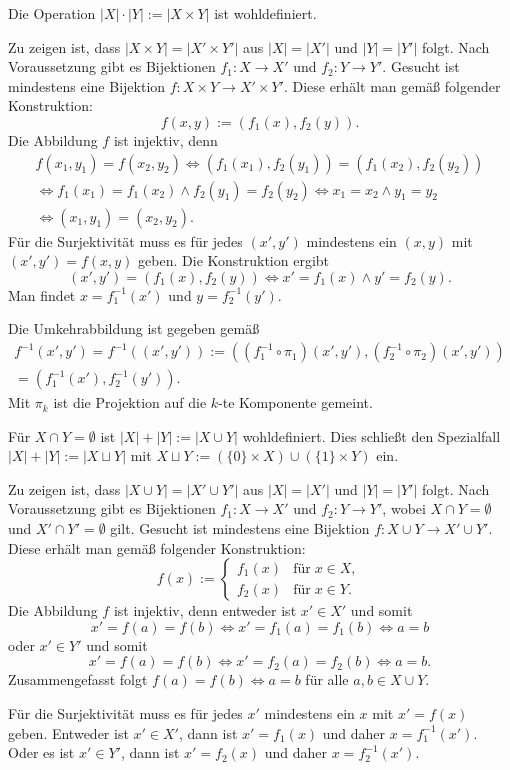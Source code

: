 \begin{Satz}\newlinefirst
Die Operation $|X|\cdot |Y|:=|X\times Y|$ ist wohldefiniert.
\end{Satz}
\begin{Beweis}
Zu zeigen ist, dass $|X\times Y|=|X'\times Y'|$
aus $|X|=|X'|$ und $|Y|=|Y'|$ folgt. Nach Voraussetzung gibt
es Bijektionen $f_1\colon X\to X'$ und $f_2\colon Y\to Y'$. Gesucht
ist mindestens eine Bijektion $f\colon X\times Y\to X'\times Y'$.
Diese erhält man gemäß folgender Konstruktion:
\[f(x,y) := (f_1(x),f_2(y)).\]
Die Abbildung $f$ ist injektiv, denn
\begin{gather*}
f(x_1,y_1)=f(x_2,y_2) \iff (f_1(x_1),f_2(y_1))=(f_1(x_2),f_2(y_2))\\
\iff f_1(x_1)=f_1(x_2)\land f_2(y_1)=f_2(y_2)\iff x_1=x_2\land y_1=y_2\\
\iff (x_1,y_1)=(x_2,y_2).
\end{gather*}
Für die Surjektivität muss es für jedes $(x',y')$ mindestens
ein $(x,y)$ mit $(x',y')=f(x,y)$ geben. Die Konstruktion ergibt
\[(x',y')=(f_1(x),f_2(y))\iff x'=f_1(x)\land y'=f_2(y).\]
Man findet $x=f_1^{-1}(x')$ und $y=f_2^{-1}(y')$.

Die Umkehrabbildung ist gegeben gemäß
\begin{gather*}
f^{-1}(x',y')=f^{-1}((x',y')):=((f_1^{-1}\circ\pi_1)(x',y'),(f_2^{-1}\circ\pi_2)(x',y'))\\
= (f_1^{-1}(x'),f_2^{-1}(y')).
\end{gather*}
Mit $\pi_k$ ist die Projektion auf die $k$-te Komponente gemeint.\;\qedsymbol
\end{Beweis}

\begin{Satz}\newlinefirst
Für $X\cap Y=\emptyset$ ist $|X|+|Y|:=|X\cup Y|$ wohldefiniert.
Dies schließt den Spezialfall $|X|+|Y|:=|X\sqcup Y|$ mit
$X\sqcup Y:=(\{0\}\times X)\cup(\{1\}\times Y)$ ein.
\end{Satz}
\begin{Beweis}
Zu zeigen ist, dass $|X\cup Y|=|X'\cup Y'|$
aus $|X|=|X'|$ und $|Y|=|Y'|$ folgt. Nach Voraussetzung gibt
es Bijektionen $f_1\colon X\to X'$ und $f_2\colon Y\to Y'$, wobei
$X\cap Y=\emptyset$ und $X'\cap Y'=\emptyset$ gilt. Gesucht
ist mindestens eine Bijektion $f\colon X\cup Y\to X'\cup Y'$.
Diese erhält man gemäß folgender Konstruktion:
\[f(x):=\begin{cases}
f_1(x)&\text{für}\;x\in X,\\
f_2(x)&\text{für}\;x\in Y.
\end{cases}\]
Die Abbildung $f$ ist injektiv, denn entweder ist $x'\in X'$
und somit
\[x'=f(a)=f(b)\iff x'=f_1(a)=f_1(b)\iff a=b\]
oder $x'\in Y'$ und somit
\[x'=f(a)=f(b)\iff x'=f_2(a)=f_2(b)\iff a=b.\]
Zusammengefasst folgt $f(a)=f(b)\iff a=b$ für alle $a,b\in X\cup Y$.

Für die Surjektivität muss es für jedes $x'$ mindestens ein $x$ mit
$x'=f(x)$ geben. Entweder ist $x'\in X'$, dann ist $x'=f_1(x)$
und daher $x=f_1^{-1}(x')$. Oder es ist $x'\in Y'$, dann ist
$x'=f_2(x)$ und daher $x=f_2^{-1}(x')$.\;\qedsymbol
\end{Beweis}

